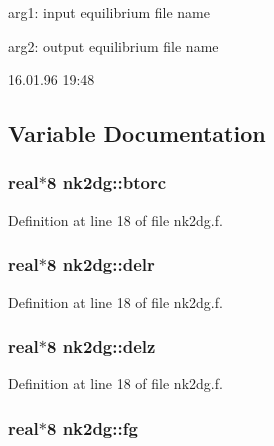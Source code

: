 arg1: input equilibrium file name

arg2: output equilibrium file name

\begin{Desc}
\item[Version:]16.01.96 19:48 \end{Desc}


\subsection{Variable Documentation}
\hypertarget{namespacenk2dg_f54459b76d986d4d7eec7446c33e6356}{
\subsubsection[btorc]{\setlength{\rightskip}{0pt plus 5cm}real$\ast$8 {\bf nk2dg::btorc}}}
\label{namespacenk2dg_f54459b76d986d4d7eec7446c33e6356}




Definition at line 18 of file nk2dg.f.\hypertarget{namespacenk2dg_f992f0e8d5ad4ef0f9529778eda2cdff}{
\subsubsection[delr]{\setlength{\rightskip}{0pt plus 5cm}real$\ast$8 {\bf nk2dg::delr}}}
\label{namespacenk2dg_f992f0e8d5ad4ef0f9529778eda2cdff}




Definition at line 18 of file nk2dg.f.\hypertarget{namespacenk2dg_654247a44246ac3e92803f639aaa7007}{
\subsubsection[delz]{\setlength{\rightskip}{0pt plus 5cm}real$\ast$8 {\bf nk2dg::delz}}}
\label{namespacenk2dg_654247a44246ac3e92803f639aaa7007}




Definition at line 18 of file nk2dg.f.\hypertarget{namespacenk2dg_309a619ea56590d21043369e3f3f50e7}{
\subsubsection[fg]{\setlength{\rightskip}{0pt plus 5cm}real$\ast$8 {\bf nk2dg::fg}}}
\label{namespacenk2dg_309a619ea56590d21043369e3f3f50e7}




